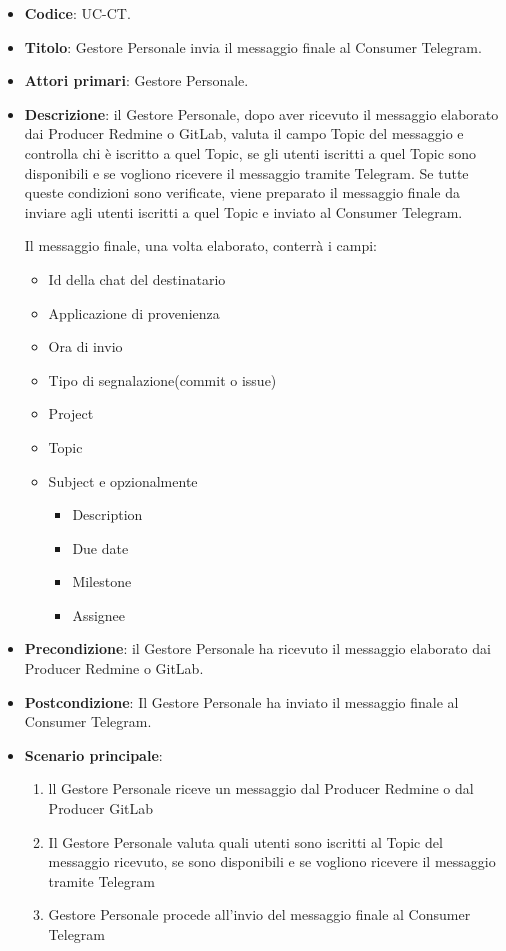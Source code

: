 	\begin{itemize}
		\item \textbf{Codice}: UC\theuccount-CT.
		\item \textbf{Titolo}: Gestore Personale invia il messaggio finale al Consumer Telegram.
		\item \textbf{Attori primari}: Gestore Personale.
		\item \textbf{Descrizione}: il Gestore Personale, dopo aver ricevuto il messaggio elaborato dai Producer Redmine o GitLab, valuta il campo Topic del messaggio e controlla chi è iscritto a quel Topic, se gli utenti iscritti a quel Topic sono disponibili e se vogliono ricevere il messaggio tramite Telegram. Se tutte queste condizioni sono verificate, viene preparato il messaggio finale da inviare
		agli utenti iscritti a quel Topic e inviato al Consumer Telegram.
		
		Il messaggio finale, una volta elaborato, conterrà i campi:
		\begin{itemize}
			\item Id della chat del destinatario
			\item Applicazione di provenienza
			\item Ora di invio
			\item Tipo di segnalazione(commit o issue)
			\item Project
			\item Topic
			\item Subject e opzionalmente
		 	\begin{itemize}
				\item Description
				\item Due date
				\item Milestone
				\item Assignee
			\end{itemize}
		\end{itemize}
		\item \textbf{Precondizione}: il Gestore Personale ha ricevuto il messaggio elaborato dai Producer Redmine o GitLab.
		\item \textbf{Postcondizione}: Il Gestore Personale ha inviato il messaggio finale al Consumer Telegram.
		\item \textbf{Scenario principale}: 
		\begin{enumerate}
			\item ll Gestore Personale riceve un messaggio dal Producer Redmine o dal Producer GitLab
			\item Il Gestore Personale valuta quali utenti sono iscritti al Topic del messaggio ricevuto, se sono disponibili e se vogliono ricevere il messaggio tramite Telegram
			\item Gestore Personale procede all'invio del messaggio finale al Consumer Telegram
		\end{enumerate}
		
	\end{itemize}